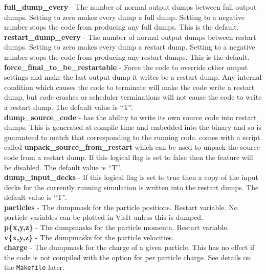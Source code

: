 \documentclass[12pt,a4paper]{article}
\newcommand{\emphtext}{\color{warwickdark} \fontfamily{phv}\selectfont\large\bf}
\newcommand{\code}[1]{{\texttt{#1}}}
\newcommand{\inlineemph}[1]{{\color{warwicklight} \bf{#1}}}
\newcommand{\EPOCH}{{\color{warwickdark}\fontfamily{phv}\selectfont{EPOCH}}}
\begin{document}
{\emphtext full\_dump\_every} - The number of normal output dumps between full
output dumps. Setting to zero makes every dump a full dump. Setting to a
negative number stops the code from producing any full dumps. This is the
default.\\

{\emphtext restart\_dump\_every} - The number of normal output dumps between
restart dumps. Setting to zero makes every dump a restart dump. Setting to a
negative number stops the code from producing any restart dumps. This is the
default.\\

{\emphtext force\_final\_to\_be\_restartable} - Force the code to override
other output settings and make the last output dump it writes be a restart
dump. Any internal condition which causes the code to terminate will make the
code write a restart dump, but code crashes or scheduler terminations will not
cause the code to write a restart dump. The default value is ``T''.\\

{\emphtext dump\_source\_code} - {\EPOCH} has the ability to write its own
source code into restart dumps. This is generated at compile time and embedded
into the binary and so is guaranteed to match that corresponding to the running
code. {\EPOCH} comes with a script called
\inlineemph{unpack\_source\_from\_restart} which can be used to unpack the
source code from a restart dump. If this logical flag is set to false then 
the feature will be disabled. The default value is ``T''.\\

{\emphtext dump\_input\_decks} - If this logical flag is set to true then
a copy of the input decks for the currently running simulation is written
into the restart dumps. The default value is ``T''.\\

{\emphtext particles} - The dumpmask for the particle positions. Restart
variable. No particle variables can be plotted in VisIt unless this is
dumped.\\

{\emphtext p\{x,y,z\}} - The dumpmasks for the particle momenta. Restart
variable.\\

{\emphtext v\{x,y,z\}} - The dumpmasks for the particle velocities.\\

{\emphtext charge} - The dumpmask for the charge of a given particle. This
has no effect if the code is not compiled with the option for per particle
charge. See details on the \code{Makefile} later.\\
\end{document}
